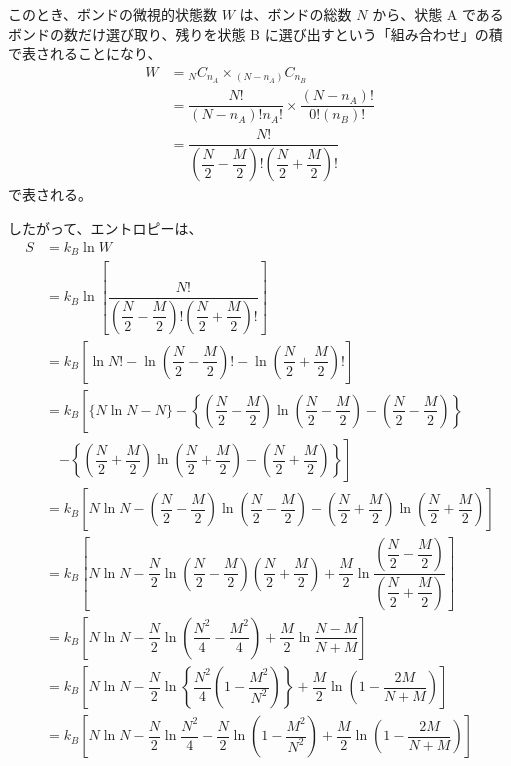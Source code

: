 \documentclass[uplatex,dvipdfmx,a4paper,11pt]{jsarticle}
\begin{document}
\begin{enumerate}
このとき、ボンドの微視的状態数 $W$ は、ボンドの総数 $N$ から、状態 A であるボンドの数だけ選び取り、残りを状態 B に選び出すという「組み合わせ」の積で表されることになり、
\begin{align*}
W 
	&= {}_N C_{n_A} \times {}_{(N-n_A)} C_{n_B} \\
	&= \dfrac{N!}{(N-n_A)! n_A!} \times \dfrac{(N-n_A)!}{0! (n_B)!} \\
	&= \dfrac{N!}{ \left( \dfrac{N}{2}-\dfrac{M}{2} \right)! \left( \dfrac{N}{2}+\dfrac{M}{2} \right)!}
\end{align*}
で表される。

したがって、エントロピーは、
\begin{align*}
S 
	&= k_B \ln W \\
	&= k_B \ln \left[ \dfrac{N!}{ \left( \dfrac{N}{2}-\dfrac{M}{2} \right)! \left( \dfrac{N}{2}+\dfrac{M}{2} \right)!} \right] \\
	&= k_B \left[ \ln N! -\ln \left( \dfrac{N}{2}-\dfrac{M}{2} \right)! -\ln \left( \dfrac{N}{2}+\dfrac{M}{2} \right)! \right]\\
	&= k_B \left[ \{ N\ln N - N \} - \left\{ \left( \dfrac{N}{2}-\dfrac{M}{2} \right)\ln \left( \dfrac{N}{2}-\dfrac{M}{2} \right) -\left( \dfrac{N}{2}-\dfrac{M}{2} \right) \right\} \right. \\
	&\quad \left. - \left\{ \left( \dfrac{N}{2}+\dfrac{M}{2} \right) \ln \left( \dfrac{N}{2}+\dfrac{M}{2} \right) - \left( \dfrac{N}{2}+\dfrac{M}{2} \right) \right\} \right]\\
	&= k_B \left[ N\ln N - \left( \dfrac{N}{2}-\dfrac{M}{2} \right)\ln \left( \dfrac{N}{2}-\dfrac{M}{2} \right) - \left( \dfrac{N}{2}+\dfrac{M}{2} \right) \ln \left( \dfrac{N}{2}+\dfrac{M}{2} \right) \right]\\
	&= k_B \left[ N\ln N - \dfrac{N}{2} \ln \left( \dfrac{N}{2}-\dfrac{M}{2} \right)\left( \dfrac{N}{2}+\dfrac{M}{2} \right) 
	+\dfrac{M}{2} \ln \dfrac{\left( \dfrac{N}{2}-\dfrac{M}{2} \right)}{ \left( \dfrac{N}{2}+\dfrac{M}{2} \right) } \right]  \\
	&= k_B \left[ N\ln N - \dfrac{N}{2} \ln \left( \dfrac{N^2}{4}-\dfrac{M^2}{4} \right) 
	+\dfrac{M}{2} \ln \dfrac{N - M}{ N+M } \right]  \\
	&= k_B \left[ N\ln N - \dfrac{N}{2} \ln \left\{ \dfrac{N^2}{4}\left(1-\dfrac{M^2}{N^2} \right) \right\} 
	+\dfrac{M}{2} \ln \left( 1 - \dfrac{2M}{N+M} \right) \right]  \\
	&= k_B \left[ N\ln N - \dfrac{N}{2} \ln \dfrac{N^2}{4} - \dfrac{N}{2} \ln \left(1-\dfrac{M^2}{N^2} \right) 
	+\dfrac{M}{2} \ln \left( 1 - \dfrac{2M}{N+M} \right) \right]  \\

\end{align*}
\end{enumerate}
\end{document}
